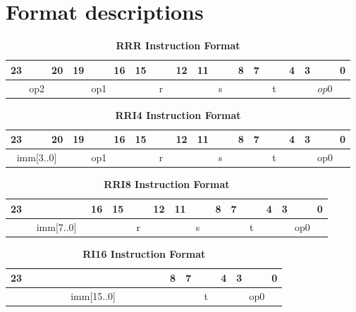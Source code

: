 \section{Format descriptions}

\setlength{\tabcolsep}{8pt}

\begin{table}[H]
    \caption{\textbf{RRR Instruction Format}}
    \begin{tabular}{llllllllllllllllllllllll}
       23 & & & 20 & 19 & & & 16 & 15 & & & 12 & 11 & & & 8 & 7 & & & 4 & 3 & & & 0 \\
        \hline
        \multicolumn{4}{|c|}{op2} & \multicolumn{4}{c|}{op1} & \multicolumn{4}{c|}{r} & \multicolumn{4}{c|}{s} & \multicolumn{4}{c|}{t} & \multicolumn{4}{c|}{$op0$}\\
        \hline
    \end{tabular}
\end{table}

\begin{table}[H]
    \caption{\textbf{RRI4 Instruction Format}}
    \begin{tabular}{llllllllllllllllllllllll}
        23 & & & 20 & 19 & & & 16 & 15 & & & 12 & 11 & & & 8 & 7 & & & 4 & 3 & & & 0 \\
        \hline
        \multicolumn{4}{|c|}{imm[3..0]} & \multicolumn{4}{c|}{op1} & \multicolumn{4}{c|}{r} & \multicolumn{4}{c|}{s} & \multicolumn{4}{c|}{t} & \multicolumn{4}{c|}{op0}\\
        \hline
    \end{tabular}
\end{table}

\begin{table}[H]
    \caption{\textbf{RRI8 Instruction Format}}
    \begin{tabular}{llllllllllllllllllllllll}
        23 & & & & & & & 16 & 15 & & & 12 & 11 & & & 8 & 7 & & & 4 & 3 & & & 0 \\
        \hline
        \multicolumn{8}{|c|}{imm[7..0]} & \multicolumn{4}{c|}{r} & \multicolumn{4}{c|}{s} & \multicolumn{4}{c|}{t} & \multicolumn{4}{c|}{op0}\\
        \hline
    \end{tabular}
\end{table}

\begin{table}[H]
    \caption{\textbf{RI16 Instruction Format}}
    \begin{tabular}{llllllllllllllllllllllll}
        23 & & & & & & & & & & & & & & & 8 & 7 & & & 4 & 3 & & & 0 \\
        \hline
        \multicolumn{16}{|c|}{imm[15..0]} & \multicolumn{4}{c|}{t} & \multicolumn{4}{c|}{op0}\\
        \hline
    \end{tabular}
\end{table}

